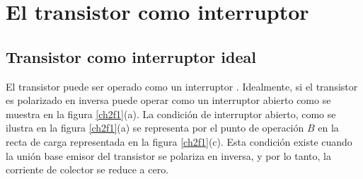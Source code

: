 \documentclass{article}
\begin{document}
\section{El transistor como interruptor}

\subsection{Transistor como interruptor ideal}
El transistor puede ser operado como un interruptor . Idealmente, si el transistor es polarizado en inversa puede operar como un interruptor abierto como se muestra en la figura \ref{ch2f1}(a). La condición de interruptor abierto, como se ilustra en la figura \ref{ch2f1}(a) se representa por el punto de operación $B$ en la recta de carga representada en la figura \ref{ch2f1}(c). Esta condición existe cuando la unión base emisor del transistor se polariza en inversa, y por lo tanto, la corriente de colector se reduce a cero.
\end{document}
